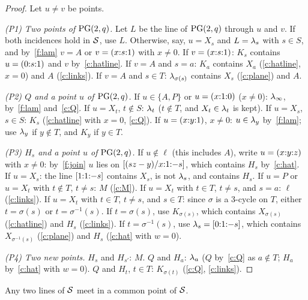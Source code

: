 \begin{proof}
Let $u \ne v$ be points.

\emph{(P1) Two points of $\mathrm{PG}(2,q)$.} Let $L$ be the line of $\mathrm{PG}(2,q)$ through $u$ and $v$. If both incidences hold in $\mathcal{S}$, use $L$. Otherwise, say, $u = X_s$ and $L = \lambda_s$ with $s \in S$, and by~\ref{f:lam} $v = A$ or $v = ({x}{:}{s}{:}{1})$ with $x \ne 0$.
If $v = ({x}{:}{s}{:}{1})$: $K_s$ contains $u = ({0}{:}{s}{:}{1})$ and $v$ by~\ref{c:hatline}.
If $v = A$ and $s = a$: $K_a$ contains $X_a$ (\ref{c:hatline}, $x=0$) and $A$ (\ref{c:links}).
If $v = A$ and $s \in T$: $\lambda_{\sigma(s)}$ contains $X_s$ (\ref{c:plane}) and $A$.

\emph{(P2) $Q$ and a point $u$ of $\mathrm{PG}(2,q)$.}
If $u \in \{A, P\}$ or $u = ({x}{:}{1}{:}{0})$ ($x \ne 0$): $\lambda_\infty$, by~\ref{f:lam} and~\ref{c:Q}.
If $u = X_t$, $t \notin S$: $\lambda_t$ ($t \notin T$, and $X_t \in \lambda_t$ is kept).
If $u = X_s$, $s \in S$: $K_s$ (\ref{c:hatline} with $x = 0$, \ref{c:Q}).
If $u = ({x}{:}{y}{:}{1})$, $x \ne 0$: $u \in \lambda_y$ by~\ref{f:lam}; use $\lambda_y$ if $y \notin T$, and $K_y$ if $y \in T$.

\emph{(P3) $H_s$ and a point $u$ of $\mathrm{PG}(2,q)$.}
If $u \notin \ell$ (this includes $A$), write $u = ({x}{:}{y}{:}{z})$ with $x \neq 0$: by~\ref{f:join} $u$ lies on $[{(sz-y)/x}{:}{1}{:}{-s}]$, which contains $H_s$ by~\ref{c:hat}.
If $u = X_s$: the line $[{1}{:}{1}{:}{-s}]$ contains $X_s$, is not $\lambda_s$, and contains $H_s$.
If $u = P$ or $u = X_t$ with $t \notin T$, $t \neq s$: $M$ (\ref{c:M}).
If $u = X_t$ with $t \in T$, $t \ne s$, and $s = a$: $\ell$ (\ref{c:links}).
If $u = X_t$ with $t \in T$, $t \neq s$, and $s \in T$: since $\sigma$ is a $3$-cycle on $T$, either $t = \sigma(s)$ or $t = \sigma^{-1}(s)$. If $t = \sigma(s)$, use $K_{\sigma(s)}$, which contains $X_{\sigma(s)}$ (\ref{c:hatline}) and $H_s$ (\ref{c:links}). If $t = \sigma^{-1}(s)$, use $\lambda_s = [{0}{:}{1}{:}{-s}]$, which contains $X_{\sigma^{-1}(s)}$ (\ref{c:plane}) and $H_s$ (\ref{c:hat} with $w = 0$).

\emph{(P4) Two new points.} $H_s$ and $H_{s'}$: $M$. $Q$ and $H_a$: $\lambda_a$ ($Q$ by~\ref{c:Q} as $a \notin T$; $H_a$ by~\ref{c:hat} with $w=0$). $Q$ and $H_t$, $t \in T$: $K_{\sigma(t)}$ (\ref{c:Q}, \ref{c:links}).
\end{proof}

\begin{lemma}[Lines]\label{lem:coords-lines}
Any two lines of $\mathcal{S}$ meet in a common point of $\mathcal{S}$.
\end{lemma}

